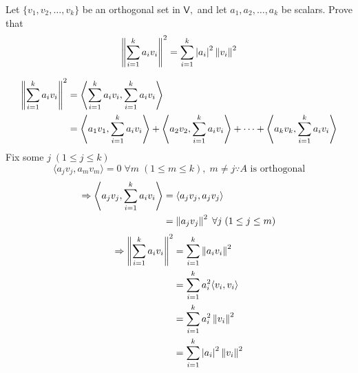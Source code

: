 Let $\{v_1,v_2,\dotsc,v_k\}$ be an orthogonal set in $\mathsf{V},$ and
let $a_1,a_2,\dotsc,a_k$ be scalars. Prove that
\[
\left\lVert\sum\limits_{i=1}^ka_iv_i\right\rVert^2 = \sum\limits_{i=1}^k \left\lvert a_i
\right\rvert^2 \left\lVert v_i\right\rVert^2
\]

\begin{align}
\left\lVert\sum\limits_{i=1}^ka_iv_i\right\rVert^2 &= \left\langle
  \sum\limits_{i=1}^ka_iv_i, \sum\limits_{i=1}^ka_iv_i\right\rangle\\
&= \left\langle a_1v_1, \sum\limits_{i=1}^ka_iv_i \right\rangle +
\left\langle a_2v_2, \sum\limits_{i=1}^ka_iv_i \right\rangle + \dotsb
+ \left\langle a_kv_k, \sum\limits_{i=1}^ka_iv_i \right\rangle 
\end{align}
Fix some $j\; (1\leq j\leq k)$
\begin{equation}
\langle a_jv_j,a_mv_m\rangle = 0 \; \forall m \; (1\leq m\leq k), \;
m \neq j \because A \text{ is orthogonal}
\end{equation}
\begin{align}
\Rightarrow \left\langle a_jv_j, \sum\limits_{i=1}^ka_iv_i \right\rangle
&= \langle a_jv_j,a_jv_j\rangle\\
&= \left\lVert a_jv_j\right\rVert^2 \; \forall j \; (1\leq j\leq m)
\end{align}
\begin{align}
\Rightarrow \left\lVert\sum\limits_{i=1}^ka_iv_i\right\rVert^2 &=  \sum\limits_{i=1}^k
\left\lVert a_iv_i\right\rVert^2\\
&= \sum\limits_{i=1}^ka_i^2 \langle v_i,v_i\rangle\\
&= \sum\limits_{i=1}^ka_i^2 \left\lVert v_i\right\rVert^2 \\
&= \sum\limits_{i=1}^k\left\lvert a_i\right\rvert^2 \left\lVert v_i\right\rVert^2 \\
\end{align}
